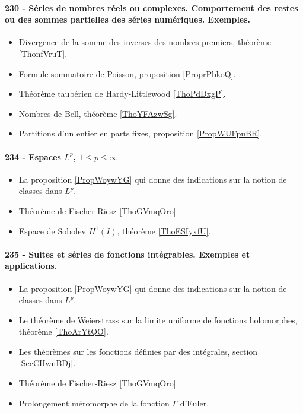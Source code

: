 \paragraph{230 - Séries de nombres réels ou complexes. Comportement des restes ou des sommes partielles des séries numériques. Exemples.}
\begin{itemize}
    \item Divergence de la somme des inverses des nombres premiers, théorème \ref{ThonfVruT}.
    \item Formule sommatoire de Poisson, proposition \ref{ProprPbkoQ}.
    \item Théorème taubérien de Hardy-Littlewood \ref{ThoPdDxgP}.
    \item Nombres de Bell, théorème \ref{ThoYFAzwSg}.
    \item Partitions d'un entier en parts fixes, proposition \ref{PropWUFpuBR}.
\end{itemize}
\paragraph{234 - Espaces \( L^p\), \( 1\leq p\leq\infty\)}
\begin{itemize}
    \item La proposition \ref{PropWoywYG} qui donne des indications sur la notion de classes dans \( L^p\).
    \item Théorème de Fischer-Riesz \ref{ThoGVmqOro}.
    \item Espace de Sobolev \( H^1(I)\), théorème \ref{ThoESIyxfU}.
\end{itemize}
\paragraph{235 - Suites et séries de fonctions intégrables. Exemples et applications.}
\begin{itemize}
    \item La proposition \ref{PropWoywYG} qui donne des indications sur la notion de classes dans \( L^p\).
    \item Le théorème de Weierstrass sur la limite uniforme de fonctions holomorphes, théorème \ref{ThoArYtQO}.
    \item Les théorèmes sur les fonctions définies par des intégrales, section \ref{SecCHwnBDj}.
    \item Théorème de Fischer-Riesz \ref{ThoGVmqOro}.
    \item Prolongement méromorphe de la fonction \( \Gamma\) d'Euler.
\end{itemize}
